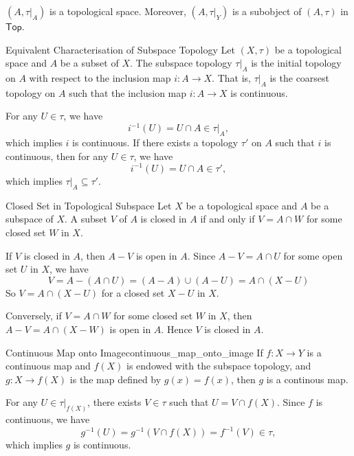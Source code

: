 \documentclass{report}
\newcommand{\Top}{\mathsf{Top}}
\begin{document}
$(A,\tau |_A)$ is a topological space. Moreover, $(A,\tau |_Y)$ is a subobject of $(A,\tau)$ in $\Top$.


\begin{proposition}{Equivalent Characterisation of Subspace Topology}{}
	Let $(X,\tau)$ be a topological space and $A$ be a subset of $X$. The subspace topology $\tau |_A$ is the initial topology on $A$ with respect to the inclusion map $i:A\to X$. That is, $\tau |_A$ is the coarsest topology on $A$ such that the inclusion map $i:A\to X$ is continuous.
\end{proposition}

\begin{prf}
	For any $U\in \tau$, we have
	\[
		i^{-1}(U)=U\cap A\in \tau|_A,
	\]
	which implies $i$ is continuous. If there exists a topology $\tau'$ on $A$ such that $i$ is continuous, then for any $U\in \tau$, we have
	\[
		i^{-1}(U)=U\cap A\in \tau',
	\]
	which implies $\tau|_A\subseteq \tau'$.
\end{prf}

\begin{proposition}{Closed Set in Topological Subspace}{}
	Let $X$ be a topological space and $A$ be a subspace of $X$. A subset $V$ of $A$ is closed in $A$ if and only if $V=A\cap W$ for some closed set $W$ in $X$.
\end{proposition}
\begin{prf}
	If $V$ is closed in $A$, then $A-V$ is open in $A$. Since $A-V=A\cap U$ for some open set $U$ in $X$, we have 
	\[
		V=A-\left(A\cap U\right)=(A-A)\cup \left(A-U\right)=A\cap (X-U)
	\]
	So $V=A\cap (X-U)$ for a closed set $X-U$ in $X$.

	Conversely, if $V=A\cap W$ for some closed set $W$ in $X$, then $A-V=A\cap (X-W)$ is open in $A$. Hence $V$ is closed in $A$.
\end{prf}

\begin{proposition}{Continuous Map onto Image}{continuous_map_onto_image}
	If $f:X\to Y$ is a continuous map and $f(X)$ is endowed with the subspace topology, and $g:X\to f(X)$ is the map defined by $g(x)=f(x)$, then $g$ is a continous map.
\end{proposition}

\begin{prf}
	For any $U\in \tau|_{f(X)}$, there exists $V\in \tau$ such that $U=V\cap f(X)$. Since $f$ is continuous, we have
	\[
		g^{-1}(U)=g^{-1}\left(V\cap f(X)\right)=f^{-1}(V)\in \tau,
	\]
	which implies $g$ is continuous.
\end{prf}
\end{document}

